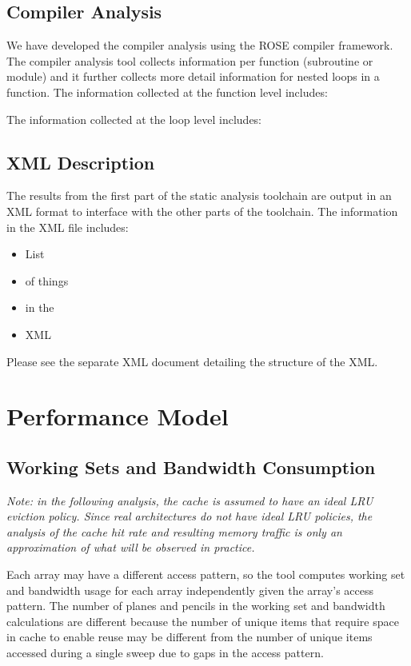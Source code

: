 \documentclass{article}
\begin{document}
\subsection{Compiler Analysis}
We have developed the compiler analysis using the ROSE compiler framework. 
The compiler analysis tool collects information per function (subroutine or module) and it further 
collects more detail information for nested loops in a function. 
The information collected at the function level includes: 

The information collected at the loop level includes:


\subsection{XML Description}

The results from the first part of the static analysis toolchain
are output in an XML format to interface with the other parts of the
toolchain.  The information in the XML file includes:
\begin{itemize}
\item List
\item of things
\item in the
\item XML
\end{itemize}
Please see the separate XML document detailing the structure of the XML.

\section{Performance Model}

\subsection{Working Sets and Bandwidth Consumption}

{\it Note: in the following analysis, the cache is assumed to have an
ideal LRU eviction policy.  Since real architectures do not have ideal
LRU policies, the analysis of the cache hit rate and resulting memory
traffic is only an approximation of what will be observed in practice.}

Each array may have a different access pattern, so the tool computes
working set and bandwidth usage for each array independently given the
array's access pattern.  The number of planes and pencils in the working
set and bandwidth calculations are different because the number of unique
items that require space in cache to enable reuse may be different from
the number of unique items accessed during a single sweep due to gaps
in the access pattern.
\end{document}
